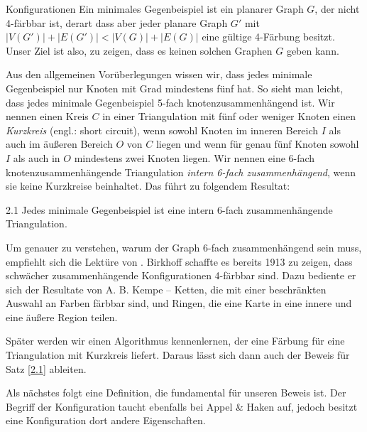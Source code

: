 \begin{section}{Konfigurationen}
 Ein minimales Gegenbeispiel ist ein planarer Graph $G$, der nicht 4-färbbar ist, derart dass aber jeder planare Graph $G'$ mit $|V(G')| + |E(G')| < |V(G)| + |E(G)|$ eine gültige 4-Färbung besitzt. Unser Ziel ist also, zu zeigen, dass es keinen solchen Graphen $G$ geben kann. 
   
 Aus den allgemeinen Vorüberlegungen wissen wir, dass jedes minimale Gegenbeispiel nur Knoten mit Grad mindestens fünf hat. So sieht man leicht, dass jedes minimale Gegenbeispiel 5-fach knotenzusammenhängend ist. Wir nennen einen Kreis $C$ in einer Triangulation mit fünf oder weniger Knoten einen \textit{Kurzkreis} (engl.: short circuit), wenn sowohl Knoten im inneren Bereich $I$ als auch im äußeren Bereich $O$ von $C$ liegen und wenn für genau fünf Knoten sowohl $I$ als auch in $O$ mindestens zwei Knoten liegen. Wir nennen eine 6-fach knotenzusammenhängende Triangulation \textit{intern 6-fach zusammenhängend}, wenn sie keine Kurzkreise beinhaltet. Das führt zu folgendem Resultat:
  
 \begin{satzl}{}{2.1}
  Jedes minimale Gegenbeispiel ist eine intern 6-fach zusammenhängende Triangulation. 
 \end{satzl}

 Um genauer zu verstehen, warum der Graph 6-fach zusammenhängend sein muss, empfiehlt sich die Lektüre von \cite{AmJMath35}. Birkhoff schaffte es bereits 1913 zu zeigen, dass schwächer zusammenhängende Konfigurationen 4-färbbar sind. Dazu bediente er sich der Resultate von A. B. Kempe -- Ketten, die mit einer beschränkten Auswahl an Farben färbbar sind, und Ringen, die eine Karte in eine innere und eine äußere Region teilen. 
 
 Später werden wir einen Algorithmus kennenlernen, der eine Färbung für eine Triangulation mit Kurzkreis liefert. Daraus lässt sich dann auch der Beweis für Satz \ref{2.1} ableiten.
 
 Als nächstes folgt eine Definition, die fundamental für unseren Beweis ist. Der Begriff der Konfiguration taucht ebenfalls bei Appel \& Haken auf, jedoch besitzt eine Konfiguration dort andere Eigenschaften.
  

\end{section}
